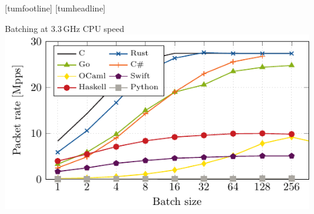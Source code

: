 \documentclass[NET,english,aspectratio=169,notitleframe]{tumbeamer}
\begin{document}

\begin{frame}{}
\vspace{-.75cm}
\centering
\end{frame}
[tumfootline]
[tumheadline]



\begin{frame}{Batching at 3.3\,GHz CPU speed}
\centering\includegraphics[scale=1.1]{figures/batches-33.pdf}
\end{frame}

%
\end{document}
